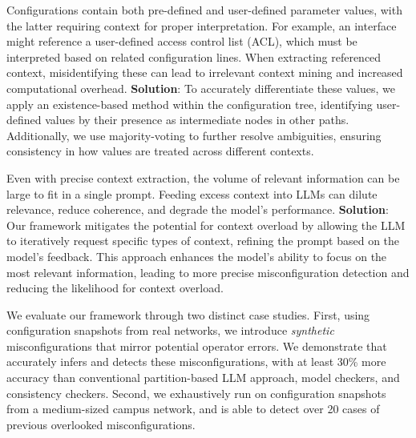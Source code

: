 Configurations contain both pre-defined and user-defined parameter values,
with the latter requiring context for proper interpretation. For example, an
interface might reference a user-defined access control list (ACL), which must
be interpreted based on related configuration lines. When extracting
referenced context, misidentifying these can lead to irrelevant context mining
and increased computational overhead. \textbf{Solution}: To accurately
differentiate these values, we apply an existence-based method within the
configuration tree, identifying user-defined values by their presence as
intermediate nodes in other paths. Additionally, we use majority-voting to
further resolve ambiguities, ensuring consistency in how values are treated across
different contexts.

Even with precise context extraction, the volume of relevant information can
be large to fit in a single prompt. 
Feeding excess context into LLMs can dilute relevance, reduce coherence, and degrade the model’s performance.
\textbf{Solution}: Our framework mitigates the potential for context overload
by allowing the LLM to iteratively request specific types of context, refining
the prompt based on the model’s feedback. This approach enhances the model’s
ability to focus on the most relevant information, leading to more precise
misconfiguration detection and reducing the likelihood for context overload.

We evaluate our framework through two distinct case studies.
First, using configuration snapshots from real networks, we introduce {\em synthetic} misconfigurations that mirror potential operator errors. 
We demonstrate that \sysname{} accurately infers and detects these misconfigurations, with at least 30\% more
accuracy than conventional partition-based LLM approach, model checkers, and consistency checkers.
Second, we exhaustively run \sysname{} on configuration snapshots from a medium-sized campus network, and \sysname{} is able to detect over 20 cases of previous overlooked misconfigurations.
